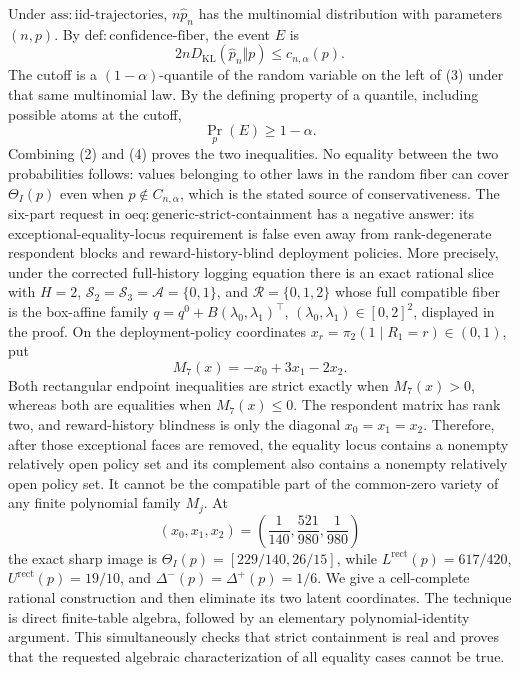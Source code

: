 Under \(\mathrm{ass{:}iid\text{-}trajectories}\), \(n\widehat p_n\) has the multinomial distribution with parameters \((n,p)\). By \(\mathrm{def{:}confidence\text{-}fiber}\), the event \(E\) is
\[
2nD_{\mathrm{KL}}(\widehat p_n\Vert p)\leq c_{n,\alpha}(p).
\tag{3}
\]
The cutoff is a \((1-\alpha)\)-quantile of the random variable on the left of (3) under that same multinomial law. By the defining property of a quantile, including possible atoms at the cutoff,
\[
\Pr_p(E)\geq1-\alpha.
\tag{4}
\]
Combining (2) and (4) proves the two inequalities. No equality between the two probabilities follows: values belonging to other laws in the random fiber can cover \(\Theta_I(p)\) even when \(p\notin C_{n,\alpha}\), which is the stated source of conservativeness.
The six-part request in \(\mathrm{oeq{:}generic\text{-}strict\text{-}containment}\) has a negative answer: its exceptional-equality-locus requirement is false even away from rank-degenerate respondent blocks and reward-history-blind deployment policies. More precisely, under the corrected full-history logging equation there is an exact rational slice with \(H=2\), \(\mathcal S_2=\mathcal S_3=\mathcal A=\{0,1\}\), and \(\mathcal R=\{0,1,2\}\) whose full compatible fiber is the box-affine family \(q=q^0+B(\lambda_0,\lambda_1)^\top\), \((\lambda_0,\lambda_1)\in[0,2]^2\), displayed in the proof. On the deployment-policy coordinates \(x_r=\pi_2(1\mid R_1=r)\in(0,1)\), put
\[
M_7(x)=-x_0+3x_1-2x_2.
\]
Both rectangular endpoint inequalities are strict exactly when \(M_7(x)>0\), whereas both are equalities when \(M_7(x)\leq0\). The respondent matrix has rank two, and reward-history blindness is only the diagonal \(x_0=x_1=x_2\). Therefore, after those exceptional faces are removed, the equality locus contains a nonempty relatively open policy set and its complement also contains a nonempty relatively open policy set. It cannot be the compatible part of the common-zero variety of any finite polynomial family \(M_j\). At
\[
(x_0,x_1,x_2)=\left(\frac1{140},\frac{521}{980},\frac1{980}\right)
\]
the exact sharp image is \(\Theta_I(p)=[229/140,26/15]\), while \(L^{\mathrm{rect}}(p)=617/420\), \(U^{\mathrm{rect}}(p)=19/10\), and \(\Delta^-(p)=\Delta^+(p)=1/6\).
We give a cell-complete rational construction and then eliminate its two latent coordinates. The technique is direct finite-table algebra, followed by an elementary polynomial-identity argument. This simultaneously checks that strict containment is real and proves that the requested algebraic characterization of all equality cases cannot be true.

